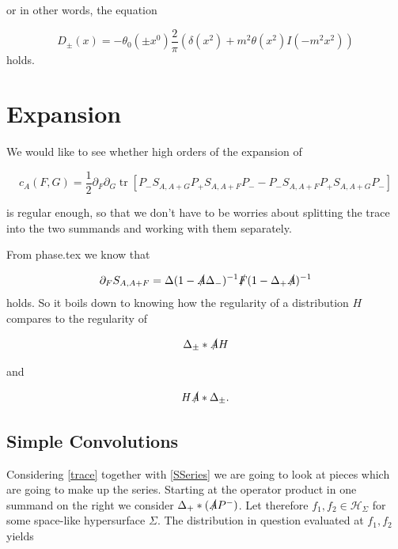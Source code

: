 \documentclass[a4paper,11pt]{article}
\DeclareMathOperator{\tr}{tr}
\begin{document}
or in other words, the equation

\begin{equation}
D_\pm (x)=- \theta_0(\pm x^0)\frac{2 }{\pi} \left( \delta(x^2)+m^2 \theta(x^2) I(-m^2x^2)\right)
\end{equation}
holds.



\section{Expansion}
We would like to see whether high orders of the expansion of 


\begin{equation}\label{trace}
c_A(F,G)=\frac{1}{2} \partial_F \partial_G \tr \left[ P_- S_{A,A+G} P_+ S_{A,A+F} P_- - P_- S_{A,A+F} P_+ S_{A,A+G} P_- \right]
\end{equation}

is regular enough, so that we don't have to be worries about splitting the trace into the two summands and working with them separately.

From phase.tex we know that

\begin{equation}\label{SSeries}
\partial_F S_{A,A+F}= \Delta (1-\slashed{A}\Delta_-)^{-1} \slashed{F} ( 1-\Delta_+ \slashed{A})^{-1}
\end{equation}
holds. So it boils down to knowing how the regularity of a distribution \(H\) compares to the regularity of

\begin{equation}
\Delta_{\pm} * \slashed{A} H
\end{equation}

and 

\begin{equation}
 H \slashed{A} * \Delta_{\pm}.
\end{equation}

\subsection{Simple Convolutions}

Considering \eqref{trace} together with \eqref{SSeries} we are going to look at pieces which are going to make up the series. Starting at the
 operator product in one summand on the right we consider  \(\Delta_+ *(\slashed{A} P^-)\). Let therefore \(f_1,f_2 \in \mathcal{H}_\Sigma\) 
for some space-like hypersurface \(\Sigma\). The distribution in question evaluated at \(f_1, f_2\) yields
\end{document}

